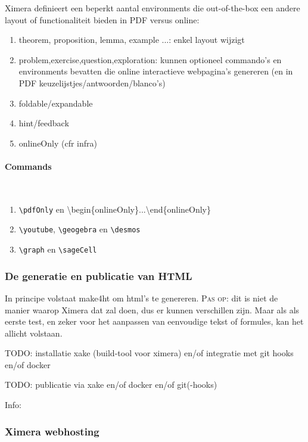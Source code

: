 \documentclass{ximera}
\begin{document}
Ximera definieert een beperkt aantal environments die out-of-the-box een andere layout of functionaliteit bieden in PDF versus online:
\begin{enumerate}
    \item theorem, proposition, lemma, example ...: enkel layout wijzigt
    \item problem,exercise,question,exploration: kunnen optioneel commando's en environments bevatten die online interactieve webpagina's genereren (en in PDF keuzelijstjes/antwoorden/blanco's)
    \item foldable/expandable
    \item hint/feedback
    \item onlineOnly (cfr infra)
\end{enumerate}
    
\paragraph{Commands} \ 

\begin{enumerate}
    \item \verb|\pdfOnly| en \textbackslash begin\{onlineOnly\}...\textbackslash end\{onlineOnly\}
    \item \verb|\youtube|, \verb|\geogebra|  en \verb|\desmos|
    \item \verb|\graph| en \verb|\sageCell|
\end{enumerate}


\subsubsection{De generatie en publicatie van HTML}

In principe volstaat make4ht om html's te genereren. \textsc{Pas op:} dit is niet de manier waarop Ximera dat zal doen, dus er kunnen verschillen zijn. Maar als als eerste test, en zeker voor het aanpassen van eenvoudige tekst of formules,  kan het allicht volstaan.


TODO: installatie xake   (build-tool voor ximera) en/of integratie met git hooks en/of docker

TODO: publicatie via xake en/of docker en/of git(-hooks)


Info: 

\subsubsection{Ximera webhosting}
\end{document}
